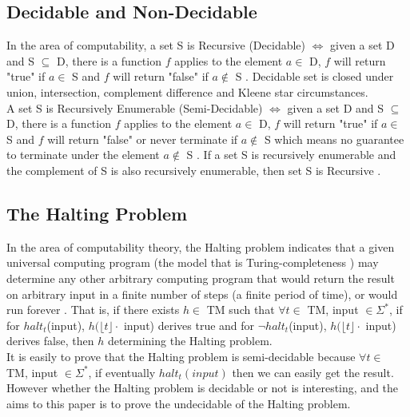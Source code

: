 \documentclass{jfrarticle}
\begin{document}
\subsection{Decidable and Non-Decidable}
In the area of computability, a set S is Recursive (Decidable) $\iff$ given a set D and S $\subseteq$ D, there is a function $f$ applies to the element $a \in$ D,
$f$ will return "true" if $a \in$ S and $f$ will return "false" if $a \notin$ S \cite{jones_computability_1997}.
Decidable set is closed under union, intersection, complement difference and Kleene star \cite{recursive_2015} circumstances.\\
A set S is Recursively Enumerable (Semi-Decidable) $\iff$ given a set D and S $\subseteq$ D, there is a function $f$ applies to the element $a \in$ D,
$f$ will return "true" if $a \in$ S and $f$ will return "false" or never terminate if $a \notin$ S which means no guarantee to terminate under the element $a \notin$ S \cite{jones_computability_1997}.
If a set S is recursively enumerable and the complement of S is also recursively enumerable, then set S is Recursive \cite{recursively_2015}.

\subsection{The Halting Problem}
In the area of computability theory, the Halting problem indicates that a given universal computing program (the model that is Turing-completeness \cite{jones_computability_1997}) 
may determine any other arbitrary computing program that would return the result on arbitrary input in a finite number of steps (a finite period of time), or would run forever \cite{halting_2015}.
That is, if there exists $h \in$ TM such that $\forall t \in$ TM, input $\in \Sigma^{*}$, if for $halt_{t}$(input), $h(\lfloor t\rfloor \cdot$ input) derives true and for $\neg halt_{t}$(input), $h(\lfloor t\rfloor \cdot$ input) derives false, then $h$ determining the Halting problem.\\
It is easily to prove that the Halting problem is semi-decidable \cite{halting_2015} because $\forall t \in$ TM, input $\in \Sigma^{*}$, if eventually $halt_{t}(input)$ then we can easily get the result.
However whether the Halting problem is decidable or not is interesting, and the aims to this paper is to prove the undecidable of the Halting problem.
\end{document}
